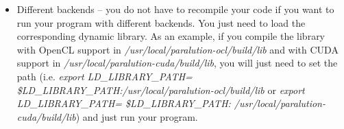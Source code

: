 \begin{itemize}
\itemsep0em

\item Different backends -- you do not have to recompile your code if you want to run your program with different backends. You just need to load the corresponding dynamic library. As an example, if you compile the library with OpenCL support in \emph{/usr/local/paralution-ocl/build/lib} and with CUDA support in \emph{/usr/local/paralution-cuda/build/lib}, you will just need to set the path (i.e. \emph{export LD\_LIBRARY\_PATH= \$LD\_LIBRARY\_PATH:/usr/local/paralution-ocl/build/lib} or \emph{export LD\_LIBRARY\_PATH= \$LD\_LIBRARY\_PATH: /usr/local/paralution-cuda/build/lib}) and just run your program.

\end{itemize}
